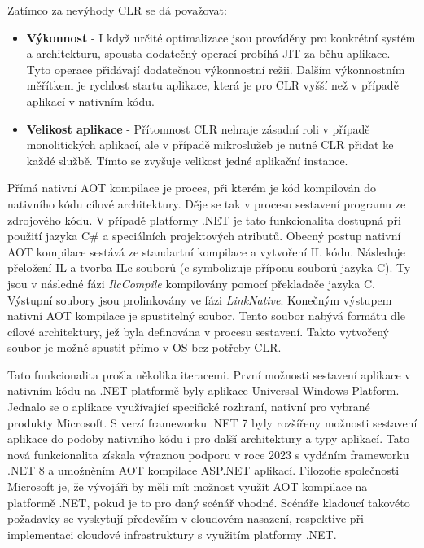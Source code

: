 Zatímco za nevýhody CLR se dá považovat:

\begin{itemize}
    \item  \textbf{Výkonnost} - I když určité optimalizace jsou prováděny pro konkrétní systém a architekturu, spousta dodatečný operací probíhá JIT za běhu aplikace. Tyto operace přidávají dodatečnou výkonnostní režii. Dalším výkonnostním měřítkem je rychlost startu aplikace, která je pro CLR vyšší než v případě aplikací v nativním kódu.
    \item \textbf{Velikost aplikace} - Přítomnost CLR nehraje zásadní roli v případě monolitických aplikací, ale v případě mikroslužeb je nutné CLR přidat ke každé službě. Tímto se zvyšuje velikost jedné aplikační instance.
\end{itemize}


Přímá nativní AOT kompilace je proces, při kterém je kód kompilován do nativního kódu cílové architektury. Děje se tak v procesu sestavení programu ze zdrojového kódu. V případě platformy .NET je tato funkcionalita dostupná při použití jazyka C\# a speciálních projektových atributů. Obecný postup nativní AOT kompilace sestává ze standartní kompilace a vytvoření IL kódu. Následuje přeložení IL a tvorba ILc souborů (c symbolizuje příponu souborů jazyka C). Ty jsou v následné fázi \emph{IlcCompile} kompilovány pomocí překladače jazyka C. Výstupní soubory jsou prolinkovány ve fázi \emph{LinkNative}. Konečným výstupem nativní AOT kompilace je spustitelný soubor. Tento soubor nabývá formátu dle cílové architektury, jež byla definována v procesu sestavení. Takto vytvořený soubor je možné spustit přímo v OS bez potřeby CLR.

Tato funkcionalita prošla několika iteracemi. První možnosti sestavení aplikace v nativním kódu na .NET platformě byly aplikace Universal Windows Platform. Jednalo se o aplikace využívající specifické rozhraní, nativní pro vybrané produkty Microsoft. S verzí frameworku .NET 7 byly rozšířeny možnosti sestavení aplikace do podoby nativního kódu i pro další architektury a typy aplikací. \cite{Pflug2023} Tato nová funkcionalita získala výraznou podporu v roce 2023 s vydáním frameworku .NET 8 a umožněním AOT kompilace ASP.NET aplikací. Filozofie společnosti Microsoft je, že vývojáři by měli mít možnost využít AOT kompilace na platformě .NET, pokud je to pro daný scénář vhodné. Scénáře kladoucí takovéto požadavky se vyskytují především v cloudovém nasazení, respektive při implementaci cloudové infrastruktury s využitím platformy .NET.

